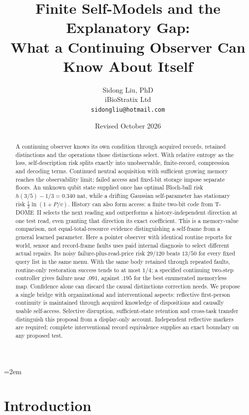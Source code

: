 \documentclass[12pt]{article}
\title{%
  \textbf{Finite Self-Models and the Explanatory Gap:}\\
  \textbf{What a Continuing Observer Can Know About Itself}%
}
\author{
  Sidong Liu, PhD \\
  \small iBioStratix Ltd \\
  \small \texttt{sidongliu@hotmail.com}
}
\date{Revised October 2026}
\theoremstyle{definition}
\theoremstyle{remark}
\begin{document}
\emergencystretch=2em
\raggedbottom
{}

\maketitle

\begin{abstract}
A continuing observer knows its own condition through acquired records,
retained distinctions and the operations those distinctions select.
With relative entropy as the loss, self-description risk splits exactly
into unobservable, finite-record, compression and decoding terms.
Continued neutral acquisition with sufficient growing memory reaches
the observability limit; failed access and fixed-bit storage impose
separate floors. An unknown qubit state supplied once has optimal
Bloch-ball risk $h(3/5)-1/3=0.340$ nat, while a drifting Gaussian
self-parameter has stationary risk $\tfrac12\ln(1+P/v)$.
History can also form access: a finite two-bit code from T-DOME~II
selects the next reading and outperforms a history-independent direction
at one test read, even granting that direction its exact coefficient.
This is a memory-value comparison, not equal-total-resource evidence
distinguishing a self-frame from a general learned parameter.
Here a pointer observer with identical routine reports for world,
sensor and record-frame faults uses paid internal diagnosis to select
different actual repairs. Its noisy failure-plus-read-price risk
$29/120$ beats $13/50$ for every fixed query list in the same menu.
With the same body retained through repeated faults, routine-only
restoration success tends to at most $1/4$; a specified continuing
two-step controller gives failure near $.091$, against $.195$ for
the best enumerated memoryless map. Confidence alone can discard
the causal distinctions correction needs.
We propose a single bridge with organizational and interventional
aspects: reflective first-person continuity is maintained through
acquired knowledge of dispositions and causally usable self-access.
Selective disruption, sufficient-state retention and cross-task
transfer distinguish this proposal from a display-only account.
Independent reflective markers are required; complete interventional
record equivalence supplies an exact boundary on any proposed test.
\end{abstract}

\clearpage
\tableofcontents
\clearpage

\section{Introduction}\label{sec:1}
\end{document}

